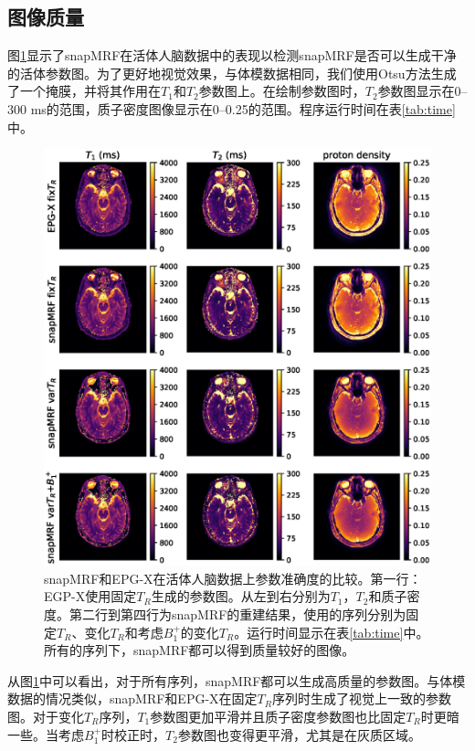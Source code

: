 \subsection{图像质量}
图\ref{fig:brain}显示了snapMRF在活体人脑数据中的表现以检测snapMRF是否可以生成干净的活体参数图。为了更好地视觉效果，与体模数据相同，我们使用Otsu方法生成了一个掩膜，并将其作用在$T_1$和$T_2$参数图上。在绘制参数图时，$T_2$参数图显示在0--300 ms的范围，质子密度图像显示在0--0.25的范围。程序运行时间在表\ref{tab:time}中。

\begin{figure}[htbp]
\centerline{\includegraphics[width=1\textwidth]{img/snapmrf/figure3.eps}}
\caption{snapMRF和EPG-X在活体人脑数据上参数准确度的比较。第一行：EGP-X使用固定$T_R$生成的参数图。从左到右分别为$T_1$，$T_2$和质子密度。第二行到第四行为snapMRF的重建结果，使用的序列分别为固定$T_R$、变化$T_R$和考虑$B_1^+$的变化$T_R$。运行时间显示在表\ref{tab:time}中。所有的序列下，snapMRF都可以得到质量较好的图像。}
\label{fig:brain}
\end{figure}

从图\ref{fig:brain}中可以看出，对于所有序列，snapMRF都可以生成高质量的参数图。与体模数据的情况类似，snapMRF和EPG-X在固定$T_R$序列时生成了视觉上一致的参数图。对于变化$T_R$序列，$T_1$参数图更加平滑并且质子密度参数图也比固定$T_R$时更暗一些。当考虑$B_1^+$时校正时，$T_2$参数图也变得更平滑，尤其是在灰质区域。

